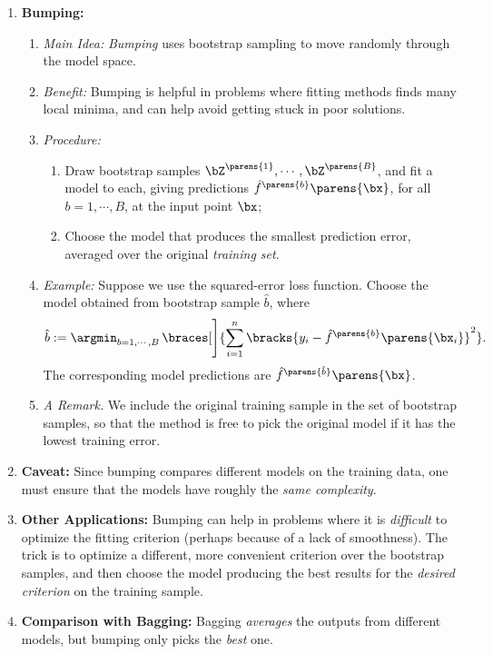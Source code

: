 \documentclass[12pt]{article}
\begin{document}
\begin{enumerate}[label=\textbf{\arabic*.}]
	
	\item \textbf{Bumping:}
	\begin{enumerate}
		\item \textit{Main Idea:} \textit{Bumping} uses bootstrap sampling to move randomly through the model space. 
		\item \textit{Benefit:} Bumping is helpful in problems where fitting methods finds many local minima, and can help avoid getting stuck in poor solutions. 
		\item \textit{Procedure:} 
		\begin{enumerate}
			\item Draw bootstrap samples $\bZ^{\parens{1}}, \cdots, \bZ^{\parens{B}}$, and fit a model to each, giving predictions $\hat{f}^{\parens{b}} \parens{\bx}$, for all $b = 1, \cdots, B$, at the input point $\bx$; 
			\item Choose the model that produces the smallest prediction error, averaged over the original \textit{training set}. 
		\end{enumerate}
		
		\item \textit{Example:} Suppose we use the squared-error loss function. Choose the model obtained from bootstrap sample $\hat{b}$, where 
		\begin{align}
			\hat{b} := \argmin_{b=1, \cdots, B} \, \braces[\Bigg]{\sum_{i=1}^n \bracks{y_i - \hat{f}^{\parens{b}} \parens{\bx_i}}^2}. 
		\end{align}
		The corresponding model predictions are $\hat{f}^{\parens{\hat{b}}} \parens{\bx}$. 
		
		\item \textit{A Remark.} We include the original training sample in the set of bootstrap samples, so that the method is free to pick the original model if it has the lowest training error. 

	\end{enumerate}
	
	\item \textbf{Caveat:} Since bumping compares different models on the training data, one must ensure that the models have roughly the \emph{same complexity}. 
	
	\item \textbf{Other Applications:} Bumping can help in problems where it is \emph{difficult} to optimize the fitting criterion (perhaps because of a lack of smoothness). The trick is to optimize a different, more convenient criterion over the bootstrap samples, and then choose the model producing the best results for the \textit{desired criterion} on the training sample. 
	
	\item \textbf{Comparison with Bagging:} Bagging \emph{averages} the outputs  from different models, but bumping only picks the \emph{best} one. 
	
\end{enumerate}

\printbibliography
\end{document}
